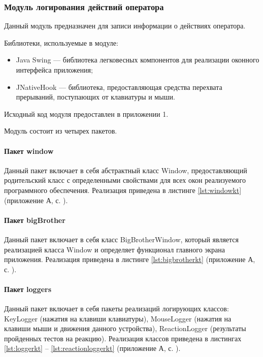\subsubsection{Модуль логирования действий оператора}
Данный модуль предназначен для записи информации о действиях оператора.

Библиотеки, используемые в модуле:

\begin{itemize}[leftmargin=1.6\parindent]
\item Java Swing \cite{swing} --- библиотека легковесных компонентов для реализации оконного интерфейса приложения;
\item JNativeHook \cite{jnativehook} --- библиотека, предоставляющая средства перехвата прерываний, поступающих от клавиатуры и мыши.
\end{itemize}

Исходный код модуля предоставлен в приложении 1.

Модуль состоит из четырех пакетов.

\paragraph{Пакет window \newline}
Данный пакет включает в себя абстрактный класс Window, предоставляющий родительский класс с определенными свойствами для всех окон реализуемого программного обеспечения. Реализация приведена в листинге \ref{lst:windowkt} (приложение А, с. \pageref{chp:application-a}).

\paragraph{Пакет bigBrother \newline}
Данный пакет включает в себя класс BigBrotherWindow, который является реализацией класса Window и определяет функционал главного экрана приложения. Реализация приведена в листинге \ref{lst:bigbrotherkt} (приложение А, с. \pageref{chp:application-a}).

\paragraph{Пакет loggers \newline}
Данный пакет включает в себя пакеты реализаций логирующих классов: KeyLogger (нажатия на клавиши клавиатуры), MouseLogger (нажатия на клавиши мыши и движения данного устройства), ReactionLogger (результаты пройденных тестов на реакцию). Реализация классов приведена в листингах \ref{lst:loggerkt} -- \ref{lst:reactionloggerkt} (приложение А, с. \pageref{chp:application-a}).


